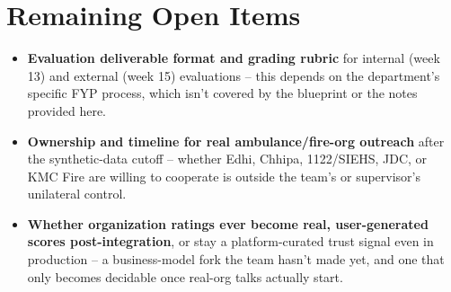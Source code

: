 \documentclass[11pt,a4paper]{article}
\begin{document}
\section*{Remaining Open Items}

\begin{itemize}
  \item \textbf{Evaluation deliverable format and grading rubric} for internal (week 13) and external (week 15) evaluations -- this depends on the department's specific FYP process, which isn't covered by the blueprint or the notes provided here.
  \item \textbf{Ownership and timeline for real ambulance/fire-org outreach} after the synthetic-data cutoff -- whether Edhi, Chhipa, 1122/SIEHS, JDC, or KMC Fire are willing to cooperate is outside the team's or supervisor's unilateral control.
  \item \textbf{Whether organization ratings ever become real, user-generated scores post-integration}, or stay a platform-curated trust signal even in production -- a business-model fork the team hasn't made yet, and one that only becomes decidable once real-org talks actually start.
\end{itemize}
\end{document}
